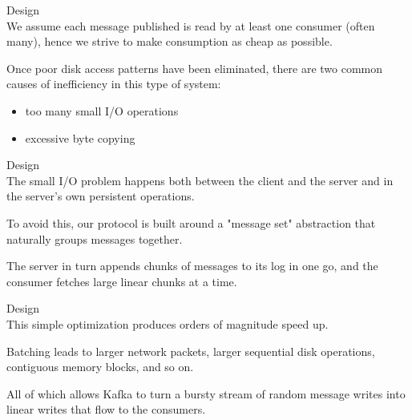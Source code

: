 \begin{frame}[plain,t]{Design} %
     \\
    \vspace{2ex}
    We assume each message published is read by at least one consumer (often many), hence we strive to make consumption as cheap as possible.
    
    \vspace{2ex}
    Once poor disk access patterns have been eliminated, there are two common causes of inefficiency in this type of system:%
    \begin{itemize}
        \item too many small I/O operations
        \item excessive byte copying
    \end{itemize}
    
    
    
\end{frame}
\begin{frame}[plain,t]{Design} %
     \\
    \vspace{2ex}
    The small I/O problem happens both between the client and the server and in the server's own persistent operations.
    
    \vspace{2ex}
    To avoid this, our protocol is built around a "message set" abstraction that naturally groups messages together. 
    
   
    \vspace{2ex}
    The server in turn appends chunks of messages to its log in one go, and the consumer fetches large linear chunks at a time.
    
    
    
    
\end{frame}
\begin{frame}[plain,t]{Design} %
     \\
    \vspace{2ex}
    This simple optimization produces orders of magnitude speed up. 
    
    \vspace{2ex}
    Batching leads to larger network packets, larger sequential disk operations, contiguous memory blocks, and so on.
    
    \vspace{2ex}
    All of which allows Kafka to turn a bursty stream of random message writes into linear writes that flow to the consumers.
    
    
    
    
\end{frame}
